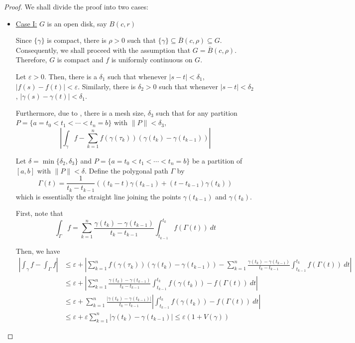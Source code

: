 \begin{proof}
We shall divide the proof into two cases: 
\begin{itemize}
    \item \underline{Case I:} $G$ is an open disk, say $B(c, r)$

    Since $\{\gamma\}$ is compact, there is $\rho > 0$ such that $\{\gamma\}\subseteq \overline B(c, \rho)\subseteq G$. Consequently, we shall proceed with the assumption that $G = \overline B(c,\rho)$. Therefore, $G$ is compact and $f$ is uniformly continuous on $G$.

    Let $\varepsilon > 0$. Then, there is a $\delta_1$ such that whenever $|s - t| < \delta_1$, $|f(s) - f(t)| < \varepsilon$. Similarly, there is $\delta_2 > 0$ such that whenever $|s - t| < \delta_2$, $|\gamma(s) - \gamma(t)| < \delta_1$.

    Furthermore, due to , there is a mesh size, $\delta_3$ such that for any partition $P = \{a = t_0 < t_1 < \cdots < t_n = b\}$ with $\|P\| < \delta_3$, 
    \begin{equation*}
        \left|\int_\gamma f - \sum_{k = 1}^n f(\gamma(\tau_k))(\gamma(t_k) - \gamma(t_{k - 1}))\right|
    \end{equation*}

    Let $\delta = \min\{\delta_2, \delta_3\}$ and $P = \{a = t_0 < t_1 < \cdots < t_n = b\}$ be a partition of $[a,b]$ with $\|P\| < \delta$. Define the polygonal path $\Gamma$ by 
    \begin{equation*}
        \Gamma(t) = \frac{1}{t_k - t_{k - 1}}\left((t_k - t)\gamma(t_{k - 1}) + (t - t_{k - 1})\gamma(t_k)\right)
    \end{equation*}
    which is essentially the straight line joining the points $\gamma(t_{k - 1})$ and $\gamma(t_k)$.

    First, note that 
    \begin{equation*}
        \int_\Gamma f = \sum_{k = 1}^n\frac{\gamma(t_{k}) - \gamma(t_{k - 1})}{t_k - t_{k - 1}}\int_{t_{k - 1}}^{t_k}f(\Gamma(t))~dt
    \end{equation*}

    Then, we have 
    \begin{align*}
        \left|\int_\gamma f - \int_\Gamma f\right|&\le\varepsilon + \left|\sum_{k = 1}^n f(\gamma(\tau_k))(\gamma(t_{k}) - \gamma(t_{k - 1})) - \sum_{k = 1}^n\frac{\gamma(t_{k}) - \gamma(t_{k - 1})}{t_k - t_{k - 1}}\int_{t_{k - 1}}^{t_k}f(\Gamma(t))~dt\right|\\
        &\le\varepsilon + \left|\sum_{k = 1}^n\frac{\gamma(t_{k}) - \gamma(t_{k - 1})}{t_k - t_{k - 1}}\int_{t_{k - 1}}^{t_k}f(\gamma(t_k)) - f(\Gamma(t))~dt\right|\\
        &\le\varepsilon + \sum_{k = 1}^n\frac{|\gamma(t_k) - \gamma(t_{k - 1})|}{t_k - t_{k - 1}}\left|\int_{t_{k - 1}}^{t_k}f(\gamma(t_k)) - f(\Gamma(t))~dt\right|\\
        &\le\varepsilon + \varepsilon\sum_{k = 1}^n|\gamma(t_k) - \gamma(t_{k - 1})| \le\varepsilon (1 + V(\gamma))
    \end{align*}


\end{itemize}
\end{proof}
